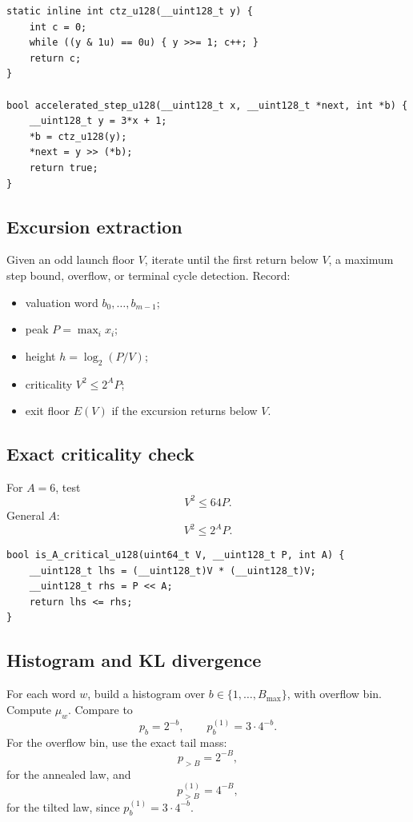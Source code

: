 \documentclass[11pt]{article}
\begin{document}
\begin{lstlisting}
static inline int ctz_u128(__uint128_t y) {
    int c = 0;
    while ((y & 1u) == 0u) { y >>= 1; c++; }
    return c;
}

bool accelerated_step_u128(__uint128_t x, __uint128_t *next, int *b) {
    __uint128_t y = 3*x + 1;
    *b = ctz_u128(y);
    *next = y >> (*b);
    return true;
}
\end{lstlisting}

\subsection{Excursion extraction}

Given an odd launch floor $V$, iterate until the first return below $V$, a maximum step bound, overflow, or terminal cycle detection.
Record:
\begin{itemize}
  \item valuation word $b_0,\dots,b_{m-1}$;
  \item peak $P=\max_i x_i$;
  \item height $h=\log_2(P/V)$;
  \item criticality $V^2\le2^A P$;
  \item exit floor $E(V)$ if the excursion returns below $V$.
\end{itemize}

\subsection{Exact criticality check}

For $A=6$, test
\[
  V^2\le 64P.
\]
General $A$:
\[
  V^2\le 2^A P.
\]

\begin{lstlisting}
bool is_A_critical_u128(uint64_t V, __uint128_t P, int A) {
    __uint128_t lhs = (__uint128_t)V * (__uint128_t)V;
    __uint128_t rhs = P << A;
    return lhs <= rhs;
}
\end{lstlisting}

\subsection{Histogram and KL divergence}

For each word $w$, build a histogram over $b\in\{1,\dots,B_{\max}\}$, with overflow bin. Compute $\mu_w$. Compare to
\[
  p_b=2^{-b},\qquad p_b^{(1)}=3\cdot4^{-b}.
\]
For the overflow bin, use the exact tail mass:
\[
  p_{>B}=2^{-B},
\]
for the annealed law, and
\[
  p^{(1)}_{>B}=4^{-B},
\]
for the tilted law, since $p_b^{(1)}=3\cdot4^{-b}$.
\end{document}
